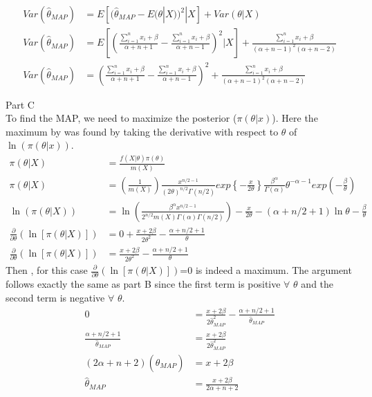 \documentclass[11pt]{article}
\begin{document}
\begin{align*}
Var(\hat{\theta}_{MAP}) &= E\left[(\hat{\theta}_{MAP}-E(\theta|X))^2|X\right]+Var\left(\theta|X\right) \\
Var(\hat{\theta}_{MAP}) &= E \left[ \left( \frac{\sum_{i=1}^{n} x_i+\beta}{\alpha+n+1} -\frac{\sum_{i=1}^n x_i+\beta}{\alpha+n-1} \right)^2 |X \right]+\frac{\sum_{i=1}^n x_i+\beta}{(\alpha+n-1)^2(\alpha+n-2)} \\
Var(\hat{\theta}_{MAP}) &=  \left( \frac{\sum_{i=1}^{n} x_i+\beta}{\alpha+n+1} -\frac{\sum_{i=1}^n x_i+\beta}{\alpha+n-1} \right)^2 +\frac{\sum_{i=1}^n x_i+\beta}{(\alpha+n-1)^2(\alpha+n-2)}
\end{align*}

\vspace{5mm}
Part C \\
To find the MAP, we need to maximize the posterior ($\pi(\theta|x)$). Here the maximum by was found by taking the derivative with respect to $\theta$ of $\ln (\pi(\theta|x))$.  
\begin{align*}
\pi(\theta|X) &=\frac{ f(X| \theta) \pi (\theta)}{m(X)} \\
\pi(\theta|X) &=\left(\frac{1}{m(X)} \right) \frac{x^{n/2-1}}{(2\theta)^{n/2} \Gamma(n/2)}exp\left\{-\frac{x}{2\theta} \right\}  \frac{\beta^\alpha}{\Gamma(\alpha)}\theta^{-\alpha-1} exp\left(-\frac{\beta}{\theta}\right) \\
\ln (\pi(\theta|X)) &= \ln \left(\frac{\beta^\alpha x^{n/2-1} }{2^{n/2} m(X) \Gamma(\alpha) \Gamma(n/2)}  \right) -\frac{x}{2 \theta}-(\alpha+n/2+1) \ln \theta -\frac{\beta}{\theta} \\
\frac{\partial}{\partial \theta} \left( \ln [\pi(\theta|X)] \right) &= 0+\frac{x+2\beta}{2\theta^2} -\frac{\alpha+n/2+1}{\theta}  \\
\frac{\partial}{\partial \theta} \left( \ln [\pi(\theta|X)] \right) &= \frac{x+2\beta}{2\theta^2} -\frac{\alpha+n/2+1}{\theta}
\end{align*}
Then , for this case $\frac{\partial}{\partial \theta} \left( \ln [\pi(\theta|X)] \right)$=0 is indeed a maximum.  The argument follows exactly the same as part B since the first term is positive $\forall$ $\theta$ and the second term is negative $\forall$ $\theta$.  
\begin{align*}
0 &=\frac{x+2\beta}{2\hat{\theta}_{MAP}^2} -\frac{\alpha+n/2+1}{\hat{\theta}_{MAP}}\\
\frac{\alpha+n/2+1}{\hat{\theta}_{MAP}}&=\frac{x+2\beta}{2\hat{\theta}_{MAP}^2}\\
(2\alpha+n+2)(\hat{\theta}_{MAP}) &= x+2\beta \\
\hat{\theta}_{MAP}&=\frac{x+2\beta}{2\alpha+n+2}
\end{align*}
\end{document}
